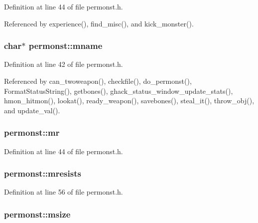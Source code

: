 Definition at line 44 of file permonst.\+h.



Referenced by experience(), find\+\_\+misc(), and kick\+\_\+monster().

\hypertarget{structpermonst_ae92da7d141243d7e37d4a12340bb248f}{
\subsubsection[{mname}]{ char$\ast$ permonst\+::mname}}\label{structpermonst_ae92da7d141243d7e37d4a12340bb248f}


Definition at line 42 of file permonst.\+h.



Referenced by can\+\_\+twoweapon(), checkfile(), do\+\_\+permonst(), Format\+Status\+String(), getbones(), ghack\+\_\+status\+\_\+window\+\_\+update\+\_\+stats(), hmon\+\_\+hitmon(), lookat(), ready\+\_\+weapon(), savebones(), steal\+\_\+it(), throw\+\_\+obj(), and update\+\_\+val().

\hypertarget{structpermonst_a5c5f71532c27c38cc57c54ef32bc27f3}{
\subsubsection[{mr}]{ permonst\+::mr}}\label{structpermonst_a5c5f71532c27c38cc57c54ef32bc27f3}


Definition at line 44 of file permonst.\+h.

\hypertarget{structpermonst_aa5260f69f42574bf223c5465b9c1858a}{
\subsubsection[{mresists}]{ permonst\+::mresists}}\label{structpermonst_aa5260f69f42574bf223c5465b9c1858a}


Definition at line 56 of file permonst.\+h.

\hypertarget{structpermonst_a29f8d76dae8c7c96eab01dd8ec27717b}{
\subsubsection[{msize}]{ permonst\+::msize}}\label{structpermonst_a29f8d76dae8c7c96eab01dd8ec27717b}


